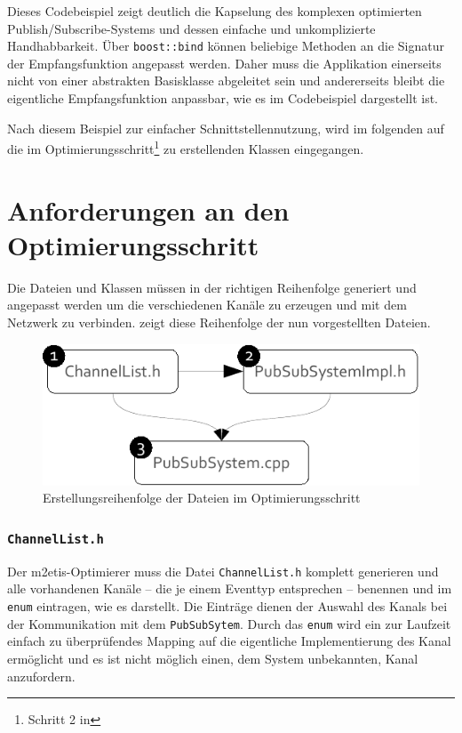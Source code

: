 

Dieses Codebeispiel zeigt deutlich die Kapselung des komplexen optimierten Publish/\-Subscribe-Systems und dessen einfache und unkomplizierte Handhabbarkeit. Über \texttt{boost::bind} können beliebige Methoden an die Signatur der Empfangsfunktion angepasst werden. Daher muss die Applikation einerseits nicht von einer abstrakten Basisklasse abgeleitet sein und andererseits bleibt die eigentliche Empfangsfunktion anpassbar, wie es im Codebeispiel dargestellt ist.

Nach diesem Beispiel zur einfacher Schnittstellennutzung, wird im folgenden auf die im Optimierungsschritt\footnote{Schritt 2 in } zu erstellenden Klassen eingegangen.

\section{Anforderungen an den Optimierungsschritt}
Die Dateien und Klassen müssen in der richtigen Reihenfolge generiert und angepasst werden um die verschiedenen Kanäle zu erzeugen und mit dem Netzwerk zu verbinden.  zeigt diese Reihenfolge der nun vorgestellten Dateien.

\begin{figure}[!h]
\centering
\includegraphics{grafics/reihenfolge.pdf}
\caption{Erstellungsreihenfolge der Dateien im Optimierungsschritt}
\label{fig:reihenfolge}
\end{figure}


\subsubsection*{\texttt{ChannelList.h}}
Der \ac{m2etis}-Optimierer muss die Datei \texttt{ChannelList.h} komplett generieren und alle vorhandenen Kanäle -- die je einem Eventtyp entsprechen -- benennen und im \texttt{enum} eintragen, wie es  darstellt. Die Einträge dienen der Auswahl des Kanals bei der Kommunikation mit dem \texttt{PubSubSytem}. Durch das \texttt{enum} wird ein zur Laufzeit einfach zu überprüfendes Mapping auf die eigentliche Implementierung des Kanal ermöglicht und es ist nicht möglich einen, dem System unbekannten, Kanal anzufordern.


